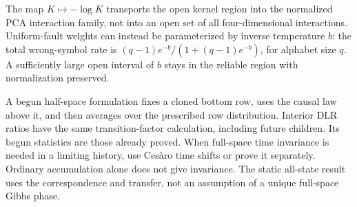 The map $K\mapsto-\log K$ transports the open kernel region into
the normalized PCA interaction family, not into an open set of all
four-dimensional interactions. Uniform-fault weights can instead
be parameterized by inverse temperature $b$: the total wrong-symbol
rate is $(q-1)e^{-b}/(1+(q-1)e^{-b})$, for alphabet size $q$.
A sufficiently large open interval of $b$ stays in the reliable
region with normalization preserved.

A begun half-space formulation fixes a cloned bottom row, uses
the causal law above it, and then averages over the prescribed row
distribution. Interior DLR ratios have the same transition-factor
calculation, including future children. Its begun statistics are
those already proved. When full-space time invariance is needed
in a limiting history, use Ces\`aro time shifts or prove it
separately. Ordinary accumulation alone does not give invariance.
The static all-state result uses the correspondence and transfer,
not an assumption of a unique full-space Gibbs phase.
